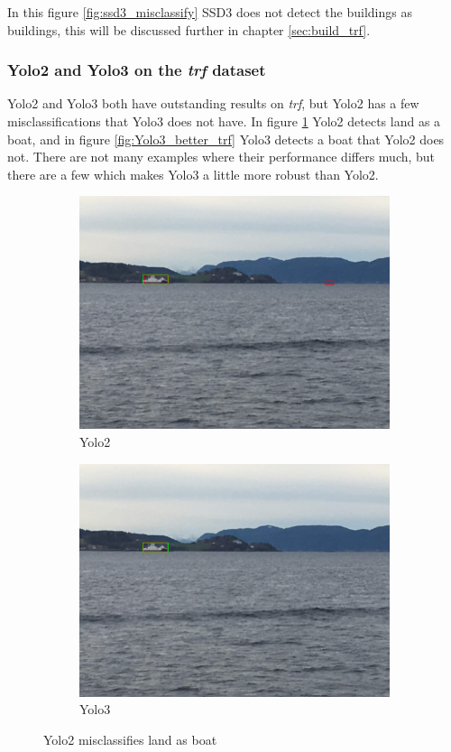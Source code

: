 In this figure \ref{fig:ssd3_misclassify} SSD3 does not detect the buildings as buildings, this will be discussed further in chapter \ref{sec:build_trf}.

\vspace{3mm}

\subsubsection{Yolo2 and Yolo3 on the \textit{trf} dataset}

Yolo2 and Yolo3 both have outstanding results on \textit{trf}, but Yolo2 has a few misclassifications that Yolo3 does not have. In figure \ref{fig:yolo2_misclassify} Yolo2 detects land as a boat, and in figure \ref{fig:Yolo3_better_trf} Yolo3 detects a boat that Yolo2 does not. There are not many examples where their performance differs much, but there are a few which makes Yolo3 a little more robust than Yolo2.

\begin{figure}[h!]
\begin{subfigure}{.5\textwidth}
  \centering
  \includegraphics[width=0.8\linewidth]{results/case_buildings/yolotrf/Yolo2/IMG_2300.jpg}
  \caption{Yolo2}
\end{subfigure}%
\begin{subfigure}{.5\textwidth}
  \centering
  \includegraphics[width=.8\linewidth]{results/case_buildings/yolotrf/Yolo3/IMG_2300.jpg}
  \caption{Yolo3}
\end{subfigure}
\caption{Yolo2 misclassifies land as boat}
\label{fig:yolo2_misclassify}
\end{figure}

